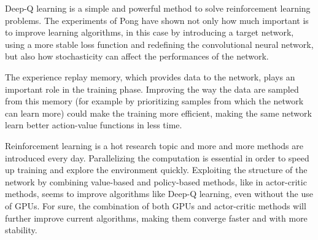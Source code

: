 \documentclass[a4paper]{article}
\numberwithin{equation}{section} %
\numberwithin{figure}{section} %
\numberwithin{table}{section} %
\theoremstyle{definition}
\begin{document}
Deep-Q learning is a simple and powerful method to solve reinforcement learning
problems. The experiments of Pong have shown not only how much important is to
improve learning algorithms, in this case by introducing a target network,
using a more stable loss function and redefining the convolutional neural network,
but also how stochasticity can affect the performances of the network.

The experience replay memory, which provides data to the network, plays an
important role in the training phase. Improving the way the data are sampled from this
memory (for example by prioritizing samples from which the network can learn
more\cite{DBLP:journals/corr/SchaulQAS15}) could make the training more efficient,
making the same network learn better action-value functions in less time.

Reinforcement learning is a hot research topic and more and more methods are
introduced every day. Parallelizing the computation is essential in order to speed
up training and explore the environment quickly. Exploiting the structure of the
network by combining value-based and policy-based methods, like in actor-critic
methods\cite{mnih2016asynchronous}, seems to improve algorithms like Deep-Q
learning, even without the use of GPUs. For sure, the combination of both
GPUs and actor-critic methods will further improve current algorithms, making them
converge faster and with more
stability\cite{babaeizadeh2016ga3c, DBLP:journals/corr/abs-1802-01561}.


\newpage



\end{document}
